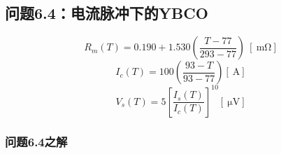 \subsection{问题6.4：电流脉冲下的YBCO}
\begin{equation}%
R_m(T)=0.190+1.530(\frac{T-77}{293-77})\ [\ \mathrm{m\Omega}]
\end{equation}
\begin{equation}%
I_c(T)=100(\frac{93-T}{93-77})[\ \mathrm{A}]
\end{equation}
\begin{equation}%
V_s(T)=5[\frac{I_s(T)}{I_c(T)}]^{10} [\ \mathrm{\mu V}]
\end{equation}


\subsubsection{问题6.4之解}

